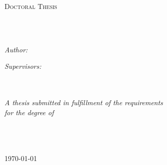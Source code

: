 \documentclass[
12pt, %
english, %
doublespacing, %
nolistspacing,
headsepline, %
]{MastersDoctoralThesis} %
\author{Amit \textsc{Patel}} %
\begin{document}
\frontmatter %

\pagestyle{plain} %


\begin{titlepage}
\begin{center}

\textsc{\Large Doctoral Thesis}\\[0.5cm] %

\HRule \\[0.2cm] %
{\Large \bfseries \ttitle\par}\vspace{0.2cm} %
\HRule \\[0.5cm] %
 
\begin{minipage}[t]{0.3\textwidth}
\begin{flushleft} \large
\emph{Author:}\\
\href{https://uk.linkedin.com/in/amit-patel-0b718111b}{\authorname} %
\end{flushleft}
\end{minipage}
\begin{minipage}[t]{0.5\textwidth}
\begin{flushright} \large
\emph{Supervisors:} \\
\href{https://www.birmingham.ac.uk/staff/profiles/cancer-genomic/billingham-lucinda.aspx}{\supname}\\ %
\href{https://www.kristianbrock.com/}{\supnameTWO}
\end{flushright}
\end{minipage}\\[2.5cm]
 


\large \textit{A thesis submitted in fulfillment of the requirements\\ for the degree of \degreename}\\[2.5cm] %



\begin{flushright}
\groupname\\\deptname\\\univname\\\today
\end{flushright}

 
\vfill
\end{center}
\end{titlepage}
\end{document}
